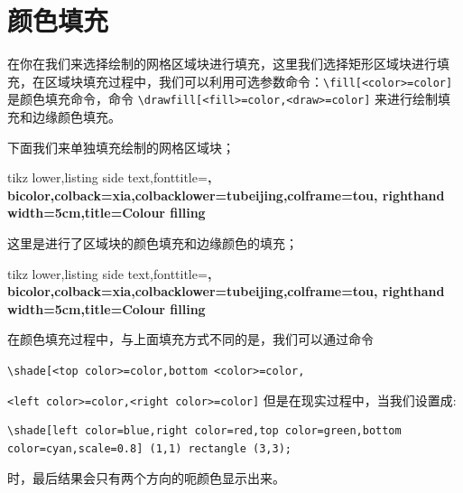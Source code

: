 \documentclass[cn,11pt, simple]{elegantbook}
\begin{document}
\section{颜色填充}

\begin{tcolorbox}[enhanced,arc=3mm,boxrule=1.5mm,
	frame hidden,colback=blue!10!white,
	borderline={1mm}{0mm}{blue,dotted} ]
	在你在我们来选择绘制的网格区域块进行填充，这里我们选择矩形区域块进行填充，在区域块填充过程中，我们可以利用可选参数命令：\verb|\fill[<color>=color]| 是颜色填充命令，命令 \verb|\drawfill[<fill>=color,<draw>=color]| 来进行绘制填充和边缘颜色填充。
	\end{tcolorbox}

下面我们来单独填充绘制的网格区域块；

	\begin{tcblisting}{tikz lower,listing side text,fonttitle=\bfseries,
		bicolor,colback=xia,colbacklower=tubeijing,colframe=tou,
		righthand width=5cm,title=Colour filling}
	\end{tcblisting}

这里是进行了区域块的颜色填充和边缘颜色的填充；

\begin{tcblisting}{tikz lower,listing side text,fonttitle=\bfseries,
	bicolor,colback=xia,colbacklower=tubeijing,colframe=tou,
	righthand width=5cm,title=Colour filling}
\end{tcblisting}

在颜色填充过程中，与上面填充方式不同的是，我们可以通过命令

\verb|\shade[<top color>=color,bottom <color>=color, |

\verb|<left color>=color,<right color>=color]|
但是在现实过程中，当我们设置成:
\begin{lstlisting}
\shade[left color=blue,right color=red,top color=green,bottom color=cyan,scale=0.8] (1,1) rectangle (3,3);
\end{lstlisting}

时，最后结果会只有两个方向的呃颜色显示出来。
\end{document}
